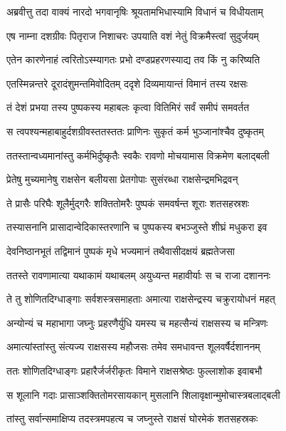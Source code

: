 \twolineshloka
{अब्रवीत्तु तदा वाक्यं नारदो भगवानृषिः}
{श्रूयतामभिधास्यामि विधानं च विधीयताम्} %

\twolineshloka
{एष नाम्ना दशग्रीवः पितृराज निशाचरः}
{उपयाति वशं नेतुं विक्रमैस्त्वां सुदुर्जयम्} %

\twolineshloka
{एतेन कारणेनाहं त्वरितोऽस्म्यागतः प्रभो}
{दण्डप्रहरणस्याद्य तव किं नु करिष्यति} %

\twolineshloka
{एतस्मिन्नन्तरे दूरादंशुमन्तमिवोदितम्}
{ददृशे दिव्यमायान्तं विमानं तस्य रक्षसः} %

\twolineshloka
{तं देशं प्रभया तस्य पुष्पकस्य महाबलः}
{कृत्वा वितिमिरं सर्वं समीपं समवर्तत} %

\twolineshloka
{स त्वपश्यन्महाबाहुर्दशग्रीवस्ततस्ततः}
{प्राणिनः सुकृतं कर्म भुञ्जानांश्चैव दुष्कृतम्} %

\twolineshloka
{ततस्तान्वध्यमानांस्तु कर्मभिर्दुष्कृतैः स्वकैः}
{रावणो मोचयामास विक्रमेण बलाद्बली} %

\twolineshloka
{प्रेतेषु मुच्यमानेषु राक्षसेन बलीयसा}
{प्रेतगोपाः सुसंरब्धा राक्षसेन्द्रमभिद्रवन्} %

\twolineshloka
{ते प्रासैः परिघैः शूलैर्मुद्गरैः शक्तितोमरैः}
{पुष्पकं समवर्षन्त शूराः शतसहस्रशः} %

\twolineshloka
{तस्यासनानि प्रासादान्वेदिकास्तरणानि च}
{पुष्पकस्य बभञ्जुस्ते शीघ्रं मधुकरा इव} %

\twolineshloka
{देवनिष्ठानभूतं तद्विमानं पुष्पकं मृधे}
{भज्यमानं तथैवासीदक्षयं ब्रह्मतेजसा} %

\twolineshloka
{ततस्ते रावणामात्या यथाकामं यथाबलम्}
{अयुध्यन्त महावीर्याः स च राजा दशाननः} %

\twolineshloka
{ते तु शोणितदिग्धाङ्गाः सर्वशस्त्रसमाहताः}
{अमात्या राक्षसेन्द्रस्य चक्रुरायोधनं महत्} %

\twolineshloka
{अन्योन्यं च महाभागा जघ्नुः प्रहरणैर्युधि}
{यमस्य च महत्सैन्यं राक्षसस्य च मन्त्रिणः} %

\twolineshloka
{अमात्यांस्तांस्तु संत्यज्य राक्षसस्य महौजसः}
{तमेव समधावन्त शूलवर्षैर्दशाननम्} %

\twolineshloka
{ततः शोणितदिग्धाङ्गः प्रहारैर्जर्जरीकृतः}
{विमाने राक्षसश्रेष्ठः फुल्लाशोक इवाबभौ} %

\twolineshloka
{स शूलानि गदाः प्रासाञ्शक्तितोमरसायकान्}
{मुसलानि शिलावृक्षान्मुमोचास्त्रबलाद्बली} %

\twolineshloka
{तांस्तु सर्वान्समाक्षिप्य तदस्त्रमपहत्य च}
{जघ्नुस्ते राक्षसं घोरमेकं शतसहस्रकः} %

